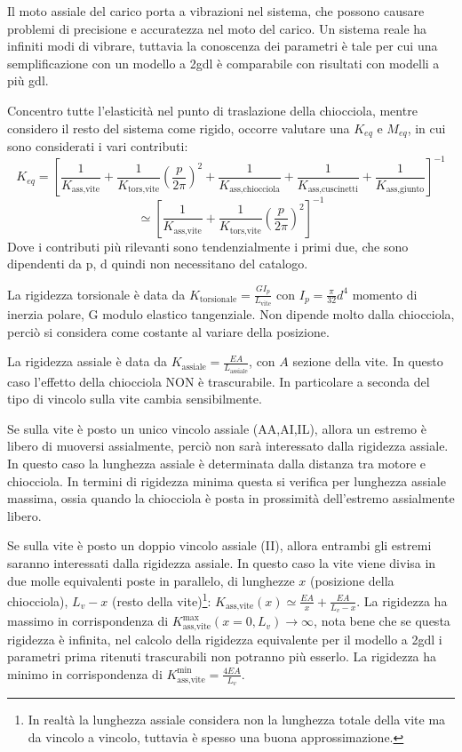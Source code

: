 Il moto assiale del carico porta a vibrazioni nel sistema, che possono causare problemi di precisione e accuratezza nel moto del carico.
Un sistema reale ha infiniti modi di vibrare, tuttavia la conoscenza dei parametri è tale per cui una semplificazione con un modello a 2gdl è comparabile con risultati con modelli a più gdl.

Concentro tutte l'elasticità nel punto di traslazione della chiocciola, mentre considero il resto del sistema come rigido, occorre valutare una \(K_{eq}\) e \( M_{eq} \), in cui sono considerati i vari contributi:
\[ K_{eq} = \left[ \frac{1}{K_\text{ass,vite}} + \frac{1}{K_\text{tors,vite}}\left(\frac{p}{2\pi}\right)^2 + \frac{1}{K_\text{ass,chiocciola}} + \frac{1}{K_\text{ass,cuscinetti}} + \frac{1}{K_\text{ass,giunto}} \right]^{-1} \] \[ \simeq \left[ \frac{1}{K_\text{ass,vite}} + \frac{1}{K_\text{tors,vite}}\left(\frac{p}{2\pi}\right)^2 \right]^{-1} \]
Dove i contributi più rilevanti sono tendenzialmente i primi due, che sono dipendenti da p, d quindi non necessitano del catalogo.

La rigidezza torsionale è data da \(K_\text{torsionale} = \frac{G I_p}{L_\text{vite}} \) con \(I_p=\frac{\pi}{32} d^4\) momento di inerzia polare, G modulo elastico tangenziale.
Non dipende molto dalla chiocciola, perciò si considera come costante al variare della posizione.

La rigidezza assiale è data da \( K_\text{assiale} = \frac{EA}{L_\text{assiale}} \), con \( A \) sezione della vite.
In questo caso l'effetto della chiocciola NON è trascurabile.
In particolare a seconda del tipo di vincolo sulla vite cambia sensibilmente.

Se sulla vite è posto un unico vincolo assiale (AA,AI,IL), allora un estremo è libero di muoversi assialmente, perciò non sarà interessato dalla rigidezza assiale.
In questo caso la lunghezza assiale è determinata dalla distanza tra motore e chiocciola.
In termini di rigidezza minima questa si verifica per lunghezza assiale massima, ossia quando la chiocciola è posta in prossimità dell'estremo assialmente libero.

Se sulla vite è posto un doppio vincolo assiale (II), allora entrambi gli estremi saranno interessati dalla rigidezza assiale.
In questo caso la vite viene divisa in due molle equivalenti poste in parallelo, di lunghezze \(x\) (posizione della chiocciola), \(L_v - x\) (resto della vite)\footnote{In realtà la lunghezza assiale considera non la lunghezza totale della vite ma da vincolo a vincolo, tuttavia è spesso una buona approssimazione.}: \(K_\text{ass,vite}(x) \simeq \frac{EA}{x} + \frac{EA}{L_v - x} \).
La rigidezza ha massimo in corrispondenza di \( K_\text{ass,vite}^\text{max} (x=0,L_v) \rightarrow \infty \), nota bene che se questa rigidezza è infinita, nel calcolo della rigidezza equivalente per il modello a 2gdl i parametri prima ritenuti trascurabili non potranno più esserlo.
La rigidezza ha minimo in corrispondenza di \(K_\text{ass,vite}^\text{min} = \frac{4EA}{L_v} \).

